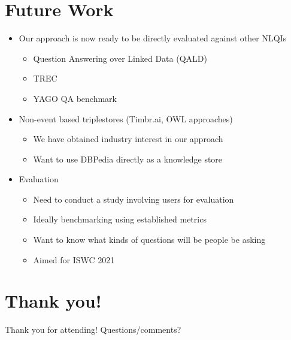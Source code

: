 \documentclass[logoontitle,tabu,supertabular,aspectratio=43]{preney-uwindsor-beamer}
\begin{document}
	\section{Future Work}
	\begin{frame}{\insertsection}
		\begin{itemize}
            \item Our approach is now ready to be directly evaluated against other NLQIs
            \begin{itemize}
                \item Question Answering over Linked Data (QALD)
                \item TREC
                \item YAGO QA benchmark
            \end{itemize}
            \item Non-event based triplestores (Timbr.ai, OWL approaches)
            \begin{itemize}
                \item We have obtained industry interest in our approach
                \item Want to use DBPedia directly as a knowledge store
            \end{itemize}
            \item Evaluation
            \begin{itemize}
                \item Need to conduct a study involving users for evaluation
                \item Ideally benchmarking using established metrics
                \item Want to know what kinds of questions will be people be asking
                \item Aimed for ISWC 2021
            \end{itemize}
		\end{itemize}
	\end{frame}


	\section*{Thank you!}
	\begin{frame}
		\begin{center}
			\huge Thank you for attending!  Questions/comments?
		\end{center}
	\end{frame}
\end{document}
